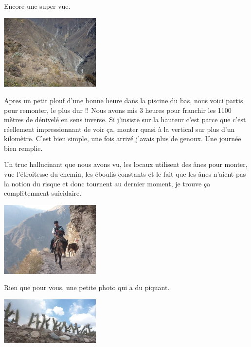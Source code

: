 \begin{multicols}{2}
Encore une super vue.

\smallbreak
\hspace*{-0.65cm}
\includegraphics[width=5cm]{articles/Arequipa-colca-titicaca/1256607348QGMH.jpg}
\smallbreak

Apres un petit plouf d'une bonne heure dans la piscine du bas, nous voici partis pour remonter, le plus dur !! Nous avons mis 3 heures pour franchir les 1100 mètres de dénivelé en sens inverse. Si j'insiste sur la hauteur c'est parce que c'est réellement impressionnant de voir ça, monter quasi à la vertical sur plus d'un kilomètre. C'est bien simple, une fois arrivé j'avais plus de genoux. Une journée bien remplie.

Un truc hallucinant que nous avons vu, les locaux utilisent des ânes pour monter, vue l'étroitesse du chemin, les éboulis constants et le fait que les ânes n'aient pas la notion du risque et donc tournent au dernier moment, je trouve ça complètemnent suicidaire.

\smallbreak
\hspace*{-0.65cm}
\includegraphics[width=5cm]{articles/Arequipa-colca-titicaca/1256607366kAzy.jpg}
\smallbreak

Rien que pour vous, une petite photo qui a du piquant.

\smallbreak
\hspace*{-0.65cm}
\includegraphics[width=5cm]{articles/Arequipa-colca-titicaca/1256607370Azvi.jpg}
\smallbreak


\end{multicols}
